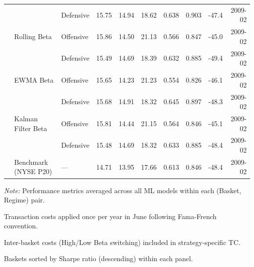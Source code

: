 \begin{table}[htbp]
{\begin{tabular}{l l l r r r r r r r}
& & Defensive & 15.75 & 14.94 & 18.62 & 0.638 & 0.903 & -47.4 & 2009-02 \\
& Rolling Beta & Offensive & 15.86 & 14.50 & 21.13 & 0.566 & 0.847 & -45.0 & 2009-02 \\
& & Defensive & 15.49 & 14.69 & 18.39 & 0.632 & 0.885 & -49.4 & 2009-02 \\
& EWMA Beta & Offensive & 15.65 & 14.23 & 21.23 & 0.554 & 0.826 & -46.1 & 2009-02 \\
& & Defensive & 15.68 & 14.91 & 18.32 & 0.645 & 0.897 & -48.3 & 2009-02 \\
& Kalman Filter Beta & Offensive & 15.81 & 14.44 & 21.15 & 0.564 & 0.846 & -45.1 & 2009-02 \\
& & Defensive & 15.48 & 14.69 & 18.32 & 0.633 & 0.885 & -48.4 & 2009-02 \\
\midrule
& Benchmark (NYSE P20) & — & 14.71 & 13.95 & 17.66 & 0.613 & 0.846 & -48.4 & 2009-02 \\
\bottomrule
\end{tabular}%
}
\begin{tablenotes}[flushleft]
\footnotesize
\item \textit{Note:} Performance metrics averaged across all ML models within each (Basket, Regime) pair.
\item Transaction costs applied once per year in June following Fama-French convention.
\item Inter-basket costs (High/Low Beta switching) included in strategy-specific TC.
\item Baskets sorted by Sharpe ratio (descending) within each panel.
\end{tablenotes}
\end{table}